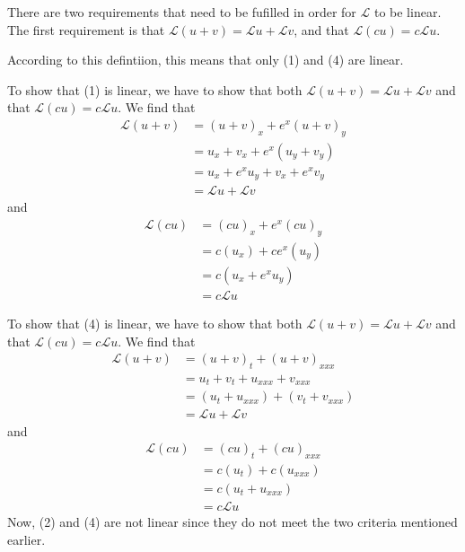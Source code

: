 \documentclass{ben}
\begin{document}
    \begin{solution}
        There are two requirements that need to be fufilled in order for $\mathscr{L}$ to be linear.
        The first requirement is that $\mathscr{L}(u + v) = \mathscr{L}u + \mathscr{L}v$, and that
        $\mathscr{L}(cu) = c\mathscr{L}u$.

        According to this defintiion, this means that only (1) and (4) are linear.

        To show that (1) is linear, we have to show that both
        $\mathscr{L}(u + v) = \mathscr{L}u + \mathscr{L}v$ and that
        $\mathscr{L}(cu) = c\mathscr{L}u$. We find that
        \begin{align*}
           \mathscr{L}(u + v) &= (u + v)_x + e^x(u + v)_y\\
           &= u_x + v_x + e^x(u_y + v_y)\\
           &= u_x + e^x u_y + v_x + e^x v_y\\
           &= \mathscr{L} u + \mathscr{L} v
        \end{align*}
        and
        \begin{align*}
            \mathscr{L}(cu) &= (cu)_x + e^x (cu)_y\\
            &= c(u_x) + ce^x (u_y)\\
            &= c(u_x + e^x u_y)\\
            &= c \mathscr{L} u
        \end{align*}
        
        To show that (4) is linear, we have to show that both
        $\mathscr{L}(u + v) = \mathscr{L}u + \mathscr{L}v$ and that
        $\mathscr{L}(cu) = c\mathscr{L}u$. We find that
        \begin{align*}
            \mathscr{L}(u + v) &= (u + v)_t + (u + v)_{xxx}\\
            &= u_t + v_t + u_{xxx} + v_{xxx}\\
            &= (u_t + u_{xxx}) + (v_t + v_{xxx})\\
            &= \mathscr{L}u + \mathscr{L}v
        \end{align*}
        and
        \begin{align*}
            \mathscr{L}(cu) &= (cu)_t + (cu)_{xxx}\\
            &= c(u_t) + c(u_{xxx})\\
            &= c(u_t + u_{xxx})\\
            &= c\mathscr{L}u
        \end{align*}
        Now, (2) and (4) are not linear since they do not meet the two criteria mentioned earlier.
    \end{solution}
\end{document}
